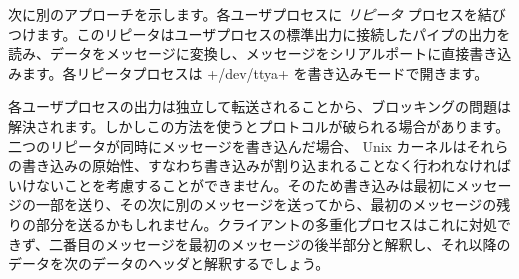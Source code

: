 次に別のアプローチを示します。各ユーザプロセスに \emph{リピータ} プロセスを結びつけます。このリピータはユーザプロセスの標準出力に接続したパイプの出力を読み、データをメッセージに変換し、メッセージをシリアルポートに直接書き込みます。各リピータプロセスは \ml+/dev/ttya+ を書き込みモードで開きます。
%
\begin{myimage}[width="100\%"]
\end{myimage}
%

各ユーザプロセスの出力は独立して転送されることから、ブロッキングの問題は解決されます。しかしこの方法を使うとプロトコルが破られる場合があります。二つのリピータが同時にメッセージを書き込んだ場合、 Unix カーネルはそれらの書き込みの原始性、すなわち書き込みが割り込まれることなく行われなければいけないことを考慮することができません。そのため書き込みは最初にメッセージの一部を送り、その次に別のメッセージを送ってから、最初のメッセージの残りの部分を送るかもしれません。クライアントの多重化プロセスはこれに対処できず、二番目のメッセージを最初のメッセージの後半部分と解釈し、それ以降のデータを次のデータのヘッダと解釈するでしょう。

